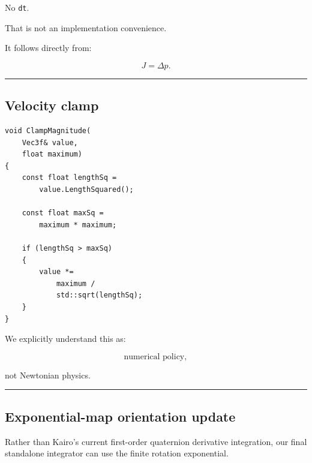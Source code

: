 No \texttt{dt}.

That is not an implementation convenience.

It follows directly from:

\[
J=\Delta p.
\]

\begin{center}\rule{0.5\linewidth}{0.5pt}\end{center}

\subsection{Velocity clamp}\label{06-engine-ii-ch039-velocity-clamp}

\begin{verbatim}
void ClampMagnitude(
    Vec3f& value,
    float maximum)
{
    const float lengthSq =
        value.LengthSquared();

    const float maxSq =
        maximum * maximum;

    if (lengthSq > maxSq)
    {
        value *=
            maximum /
            std::sqrt(lengthSq);
    }
}
\end{verbatim}

We explicitly understand this as:

\[
\text{numerical policy},
\]

not Newtonian physics.

\begin{center}\rule{0.5\linewidth}{0.5pt}\end{center}

\subsection{Exponential-map orientation update}\label{06-engine-ii-ch039-exponential-map-orientation-update}

Rather than Kairo's current first-order quaternion derivative integration, our final standalone integrator can use the finite rotation exponential.

